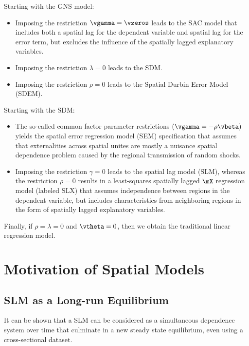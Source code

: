 \documentclass[english,12pt]{book}\usepackage[]{graphicx}\usepackage[]{xcolor}
\begin{document}
Starting with the GNS model:

\begin{itemize}
  \item Imposing the restriction $\vgamma = \vzeros$ leads to the SAC model that includes both a spatial lag for the dependent variable and spatial lag for the error term, but excludes the influence of the spatially lagged explanatory variables. 
  \item Imposing the restriction $\lambda = 0$ leads to the SDM.
  \item Imposing the restriction $\rho = 0$ leads to the Spatial Durbin Error Model (SDEM). 
\end{itemize}

Starting with the SDM:

\begin{itemize}
  \item The so-called common factor parameter restrictions $(\vgamma = -\rho\vbeta)$ yields the spatial error regression model (SEM) specification that assumes that externalities across spatial unites are mostly a nuisance spatial dependence problem caused by the regional transmission of random shocks. 
  \item Imposing the restriction $\gamma = 0$ leads to the spatial lag model (SLM), whereas the restriction $\rho = 0$ results in a least-squares spatially lagged $\mX$ regression model (labeled SLX) that assumes independence between regions in the dependent variable, but includes characteristics from neighboring regions in the form of spatially lagged explanatory variables.  
\end{itemize}

Finally, if $\rho = \lambda = 0$ and $\vtheta = 0$, then we obtain the traditional linear regression model. 

\section{Motivation of Spatial Models}\label{sec:motivation}

\subsection{SLM as a Long-run Equilibrium}\label{sec:SLM_lre}

It can be shown that a SLM can be considered as a simultaneous dependence system over time that culminate in a new steady state equilibrium, even using a cross-sectional dataset.
\end{document}
